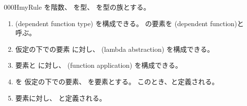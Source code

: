 \documentclass[index]{subfiles}
\begin{document}
\begin{myBlock}{000H}{myRule}
  を階数、
  を型、
  を型の族とする。
  \begin{enumerate}
  \item {}(dependent function type)
    を構成できる。
    の要素を
    (dependent function)と呼ぶ。
  \item 仮定の下での要素
    に対し、
    (lambda abstraction)
    を構成できる。
  \item 要素と
    に対し、
    (function application)
    を構成できる。
  \item {}を
    仮定の下での要素、
    を要素とする。
    このとき、と定義される。
  \item 要素に対し、
    と定義される。
  \end{enumerate}
\end{myBlock}
\end{document}
